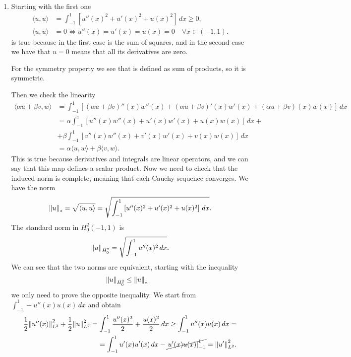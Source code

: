 \begin{enumerate}
    \item Starting with the first one
    \[
        \begin{aligned}
            \langle u, u \rangle &= \int_{-1}^1 \left[ u''(x)^2 + u'(x)^2 + u(x)^2 \right] \, dx \geq 0, \\
            \langle u, u \rangle &= 0 \iff u''(x) = u'(x) = u(x) = 0 \quad \forall x \in (-1, 1).
        \end{aligned}
    \]
    is true because in the first case is the sum of squares, and in the second case we have that \(u = 0\) means that all its derivatives are zero. 

    For the symmetry property we see that is defined as sum of products, so it is symmetric.

    Then we check the linearity 
    \[
        \begin{aligned}
            \langle \alpha u + \beta v, w \rangle &= \int_{-1}^1 \left[ (\alpha u + \beta v)''(x) w''(x) + (\alpha u + \beta v)'(x) w'(x) + (\alpha u + \beta v)(x) w(x) \right] \, dx \\
            &= \alpha \int_{-1}^1 \left[ u''(x) w''(x) + u'(x) w'(x) + u(x) w(x) \right] \, dx +\\
            &+ \beta \int_{-1}^1 \left[ v''(x) w''(x) + v'(x) w'(x) + v(x) w(x) \right] \, dx \\
            &= \alpha \langle u, w \rangle + \beta \langle v, w \rangle.
        \end{aligned}
    \]
    This is true because derivatives and integrals are linear operators, and we can say that this map defines a scalar product.
    Now we need to check that the induced norm is complete, meaning that each Cauchy sequence converges. We have the norm 
    \[
        \norm{u}_* = \sqrt{\langle u, u \rangle} = \sqrt{\int_{-1}^1 \left[ u''(x)^2 + u'(x)^2 + u(x)^2 \right] \, dx}.
    \]
    The standard norm in \(H^2_0(-1, 1)\) is
    \[
        \norm{u}_{H^2_0} = \sqrt{\int_{-1}^1 u''(x)^2 \, dx}.
    \]
    We can see that the two norms are equivalent, starting with the inequality
    \begin{align*}
        \norm{u}_{H^2_0} &\leq \norm{u}_* 
    \end{align*}
    we only need to prove the opposite inequality. We start from \(\int_{-1}^1 -u''(x) u (x) \, dx \) and obtain
    \[
        \begin{split}
            \frac{1}{2} \norm{u''(x)}^2_{L^2} + \frac{1}{2} \norm{u}^2_{L^2} = \int_{-1}^1 \frac{u''(x)^2}{2} + \frac{u(x)^2}{2} \, dx \geq \int_{-1}^1 u''(x) u(x) \, dx =\\= \int_{-1}^1 u'(x) u'(x) \, dx - \cancel{\left. u'(x) u(x) \right|_{-1}^1} = \norm{u'}^2_{L^2}.

\end{split}\]
\end{enumerate}
